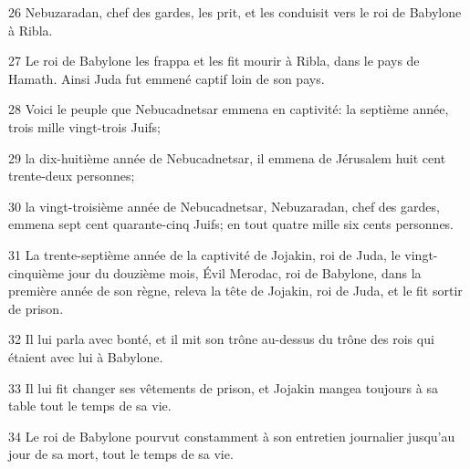 \par 26 Nebuzaradan, chef des gardes, les prit, et les conduisit vers le roi de Babylone à Ribla.
\par 27 Le roi de Babylone les frappa et les fit mourir à Ribla, dans le pays de Hamath. Ainsi Juda fut emmené captif loin de son pays.
\par 28 Voici le peuple que Nebucadnetsar emmena en captivité: la septième année, trois mille vingt-trois Juifs;
\par 29 la dix-huitième année de Nebucadnetsar, il emmena de Jérusalem huit cent trente-deux personnes;
\par 30 la vingt-troisième année de Nebucadnetsar, Nebuzaradan, chef des gardes, emmena sept cent quarante-cinq Juifs; en tout quatre mille six cents personnes.
\par 31 La trente-septième année de la captivité de Jojakin, roi de Juda, le vingt-cinquième jour du douzième mois, Évil Merodac, roi de Babylone, dans la première année de son règne, releva la tête de Jojakin, roi de Juda, et le fit sortir de prison.
\par 32 Il lui parla avec bonté, et il mit son trône au-dessus du trône des rois qui étaient avec lui à Babylone.
\par 33 Il lui fit changer ses vêtements de prison, et Jojakin mangea toujours à sa table tout le temps de sa vie.
\par 34 Le roi de Babylone pourvut constamment à son entretien journalier jusqu'au jour de sa mort, tout le temps de sa vie.


